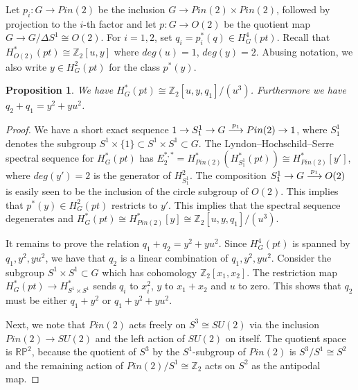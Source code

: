 \documentclass{amsart}
\newtheorem{proposition}[theorem]{Proposition}
\theoremstyle{definition}
\theoremstyle{remark}
\numberwithin{equation}{section}
\begin{document}
Let $p_i : G \to Pin(2)$ be the inclusion $G \to Pin(2) \times Pin(2)$, followed by projection to the $i$-th factor and let $p : G \to O(2)$ be the quotient map $G \to G/\Delta S^1 \cong O(2)$. For $i=1,2$, set $q_i = p_i^*(q) \in H^4_{G}(pt)$. Recall that $H^*_{O(2)}(pt) \cong \mathbb{Z}_2[u,y]$ where $deg(u) = 1$, $deg(y) = 2$. Abusing notation, we also write $y \in H^2_{G}(pt)$ for the class $p^*(y)$.

\begin{proposition}\label{prop:q12}
We have $H^*_G(pt) \cong \mathbb{Z}_2[u,y,q_1]/(u^3)$. Furthermore we have $q_2 + q_1 = y^2 + yu^2$.
\end{proposition}
\begin{proof}
We have a short exact sequence $1 \to S^1_1 \to G \buildrel p_1 \over \longrightarrow Pin(2) \to 1$, where $S^1_1$ denotes the subgroup $S^1 \times \{1\} \subset S^1 \times S^1 \subset G$. The Lyndon--Hochschild--Serre spectral sequence for $H^*_G(pt)$ has $E_2^{*,*} = H^*_{Pin(2)}( H^*_{S^1_1}(pt) ) \cong H^*_{Pin(2)}[y']$, where $deg(y') = 2$ is the generator of $H^2_{S^1_1}$. The composition $S^1_1 \to G \buildrel p_1 \over \longrightarrow O(2)$ is easily seen to be the inclusion of the circle subgroup of $O(2)$. This implies that $p^*(y) \in H^2_G(pt)$ restricts to $y'$. This implies that the spectral sequence degenerates and $H^*_G(pt) \cong H^*_{Pin(2)}[y] \cong \mathbb{Z}_2[u,y,q_1]/(u^3)$.

It remains to prove the relation $q_1 + q_2 = y^2 + yu^2$. Since $H^4_{G}(pt)$ is spanned by $q_1,y^2,yu^2$, we have that $q_2$ is a linear combination of $q_1, y^2, yu^2$. Consider the subgroup $S^1 \times S^1 \subset G$ which has cohomology $\mathbb{Z}_2[x_1,x_2]$. The restriction map $H^*_{G}(pt) \to H^*_{S^1 \times S^1}$ sends $q_i$ to $x_i^2$, $y$ to $x_1+x_2$ and $u$ to zero. This shows that $q_2$ must be either $q_1 + y^2$ or $q_1 + y^2 + yu^2$. 

Next, we note that $Pin(2)$ acts freely on $S^3 \cong SU(2)$ via the inclusion $Pin(2) \to SU(2)$ and the left action of $SU(2)$ on itself. The quotient space is $\mathbb{RP}^2$, because the quotient of $S^3$ by the $S^1$-subgroup of $Pin(2)$ is $S^3/S^1 \cong S^2$ and the remaining action of $Pin(2)/S^1 \cong \mathbb{Z}_2$ acts on $S^2$ as the antipodal map.


\end{proof}
\end{document}
